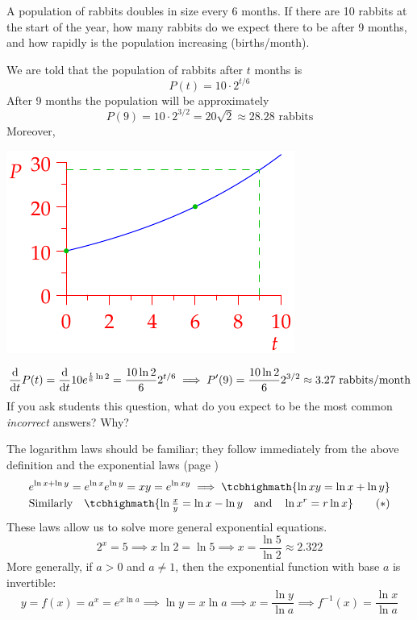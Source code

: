 \begin{example}{}{}
	A population of rabbits doubles in size every 6 months. If there are 10 rabbits at the start of the year, how many rabbits do we expect there to be after 9 months, and how rapidly is the population increasing (births/month).\par
	\begin{minipage}[t]{0.6\linewidth}\vspace{-3pt}
	  We are told that the population of rabbits after $t$ months is
	  \[
	  	P(t)=10\cdot 2^{t/6}
	  \]
	  After 9 months the population will be approximately
	  \[
	  	P(9)=10\cdot 2^{3/2}=20\sqrt 2\approx 28.28\text{ rabbits}
	  \]
	  Moreover,
	  \end{minipage}
	  \hfill
	  \begin{minipage}[t]{0.39\linewidth}\vspace{-10pt}
	  	\flushright\includegraphics{rabbits}
	  \end{minipage}\par\vspace{-3pt}
	  \[
	  	\frac{\mathrm{d} }{\mathrm{d} t}P(t)=\frac{\mathrm{d} }{\mathrm{d} t}10e^{\frac t6\ln 2}
	  	=\frac{10\ln 2} 62^{t/6}
	  	\implies P'(9)=\frac{10\ln 2}62^{3/2}
	  	\approx 3.27\text{ rabbits/month}
	  \]
	  If you ask students this question, what do you expect to be the most common \emph{incorrect} answers? Why?
\end{example}


\goodbreak



The logarithm laws should be familiar; they follow immediately from the above definition and the exponential laws (page \pageref{pg:explaws})
\begin{gather*}
	e^{\ln x+\ln y}=e^{\ln x}e^{\ln y}=xy=e^{\ln xy}\implies \tcbhighmath{\ln xy=\ln x+\ln y}\\
	\text{Similarly}\quad \tcbhighmath{\ln\tfrac xy=\ln x-\ln y\quad\text{and}\quad \ln x^r=r\ln x}\tag{$\ast$}
\end{gather*}
These laws allow us to solve more general exponential equations.
\[
	2^{x}=5\implies x\ln 2=\ln 5\implies x=\frac{\ln 5}{\ln 2}\approx 2.322
\]
More generally, if $a>0$ and $a\neq 1$, then the exponential function with base $a$ is invertible:
\[
	y=f(x)=a^x=e^{x\ln a}\implies \ln y=x\ln a\implies x=\frac{\ln y}{\ln a}\implies f^{-1}(x)=\frac{\ln x}{\ln a}
\]

